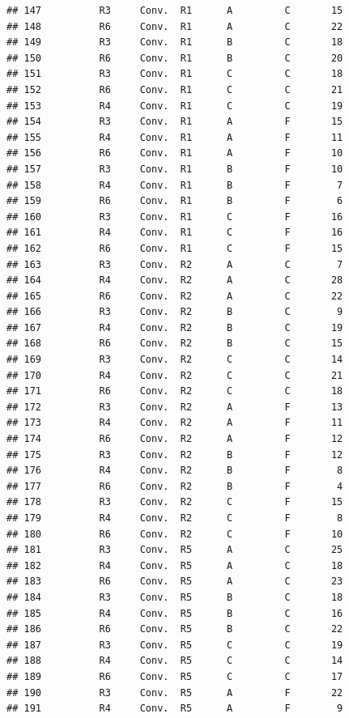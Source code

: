 \documentclass[
]{article}
\begin{document}
\begin{verbatim}
## 147          R3     Conv.  R1      A         C       15
## 148          R6     Conv.  R1      A         C       22
## 149          R3     Conv.  R1      B         C       18
## 150          R6     Conv.  R1      B         C       20
## 151          R3     Conv.  R1      C         C       18
## 152          R6     Conv.  R1      C         C       21
## 153          R4     Conv.  R1      C         C       19
## 154          R3     Conv.  R1      A         F       15
## 155          R4     Conv.  R1      A         F       11
## 156          R6     Conv.  R1      A         F       10
## 157          R3     Conv.  R1      B         F       10
## 158          R4     Conv.  R1      B         F        7
## 159          R6     Conv.  R1      B         F        6
## 160          R3     Conv.  R1      C         F       16
## 161          R4     Conv.  R1      C         F       16
## 162          R6     Conv.  R1      C         F       15
## 163          R3     Conv.  R2      A         C        7
## 164          R4     Conv.  R2      A         C       28
## 165          R6     Conv.  R2      A         C       22
## 166          R3     Conv.  R2      B         C        9
## 167          R4     Conv.  R2      B         C       19
## 168          R6     Conv.  R2      B         C       15
## 169          R3     Conv.  R2      C         C       14
## 170          R4     Conv.  R2      C         C       21
## 171          R6     Conv.  R2      C         C       18
## 172          R3     Conv.  R2      A         F       13
## 173          R4     Conv.  R2      A         F       11
## 174          R6     Conv.  R2      A         F       12
## 175          R3     Conv.  R2      B         F       12
## 176          R4     Conv.  R2      B         F        8
## 177          R6     Conv.  R2      B         F        4
## 178          R3     Conv.  R2      C         F       15
## 179          R4     Conv.  R2      C         F        8
## 180          R6     Conv.  R2      C         F       10
## 181          R3     Conv.  R5      A         C       25
## 182          R4     Conv.  R5      A         C       18
## 183          R6     Conv.  R5      A         C       23
## 184          R3     Conv.  R5      B         C       18
## 185          R4     Conv.  R5      B         C       16
## 186          R6     Conv.  R5      B         C       22
## 187          R3     Conv.  R5      C         C       19
## 188          R4     Conv.  R5      C         C       14
## 189          R6     Conv.  R5      C         C       17
## 190          R3     Conv.  R5      A         F       22
## 191          R4     Conv.  R5      A         F        9

\end{verbatim}
\end{document}
